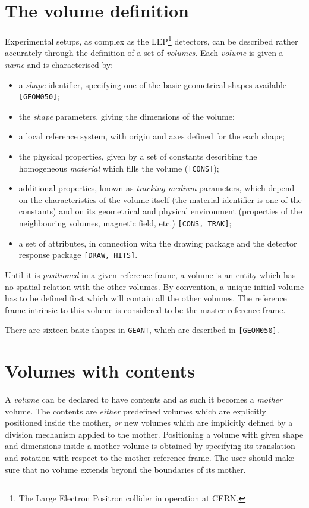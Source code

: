 \section{ The volume definition }

Experimental setups, as complex as the LEP\footnote{The Large Electron Positron
collider in operation at CERN.} detectors, can be described 
rather accurately through the definition of a set of {\it volumes}.
Each {\it volume} is given a {\it name} and is characterised by:
\begin{itemize}
\item a {\it shape} identifier, specifying one of the basic
          geometrical shapes available {\tt [GEOM050]};
\item   the {\it shape} parameters, giving the dimensions of the volume;
\item   a local reference system, with origin and axes defined
for the each shape;
\item    the physical properties, given by a set of constants describing the
homogeneous {\it material} which fills the volume ({\tt [CONS]});
\item  additional properties, known as {\it tracking medium} parameters,
which depend on the characteristics of the volume itself (the
material identifier is one of the constants) and on its geometrical and
physical environment (properties of the neighbouring volumes, magnetic field, 
etc.) {\tt [CONS, TRAK]};
\item  a set of attributes, in connection with the drawing package
and the detector response package {\tt [DRAW, HITS]}.
\end{itemize}
Until it is {\it positioned} in a given reference frame,
a volume is an entity which has no spatial relation with the other volumes.
By convention, a unique initial volume has to be defined first
which will contain
all the other volumes. The reference frame intrinsic
to this volume is considered to be the master reference frame.

There are sixteen basic shapes in {\tt GEANT}, which are described in
{\tt [GEOM050]}.

\section{Volumes with contents}
A {\it volume} can be declared to have contents and as such it becomes a 
{\it mother}
volume. The contents are {\it either} predefined volumes which are explicitly 
positioned inside the mother, {\it or} new volumes which are implicitly defined
by a division mechanism applied to the mother. Positioning a volume with given 
shape and dimensions inside a mother volume is obtained by specifying its 
translation and rotation with respect to the mother reference frame. The user 
should make sure that no volume extends beyond the boundaries of its mother.

